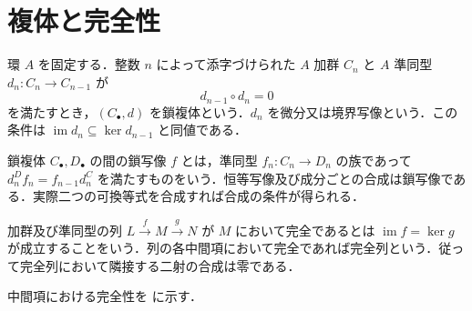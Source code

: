 \section{複体と完全性}
\begin{defn}[鎖複体]
環 $A$ を固定する．整数 $n$ によって添字づけられた $A$ 加群 $C_n$ と $A$ 準同型 $d_n:C_n\to C_{n-1}$ が
\[
 d_{n-1}\circ d_n=0
\]
を満たすとき，$(C_\bullet,d)$ を鎖複体という．$d_n$ を微分又は境界写像という．この条件は $\operatorname{im}d_n\subseteq\ker d_{n-1}$ と同値である．
\end{defn}
\begin{defn}[鎖写像]
鎖複体 $C_\bullet,D_\bullet$ の間の鎖写像 $f$ とは，準同型 $f_n:C_n\to D_n$ の族であって $d_n^D f_n=f_{n-1}d_n^C$ を満たすものをいう．恒等写像及び成分ごとの合成は鎖写像である．実際二つの可換等式を合成すれば合成の条件が得られる．
\end{defn}
\begin{defn}[完全列]
加群及び準同型の列 $L\xrightarrow f M\xrightarrow g N$ が $M$ において完全であるとは $\operatorname{im}f=\ker g$ が成立することをいう．列の各中間項において完全であれば完全列という．従って完全列において隣接する二射の合成は零である．
\end{defn}
中間項における完全性を  に示す．
